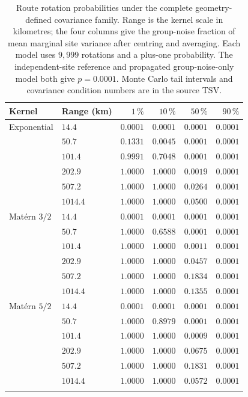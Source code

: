 \begin{table}[htbp]\centering\small
\caption{Route rotation probabilities under the complete geometry-defined covariance family. Range is the kernel scale in kilometres; the four columns give the group-noise fraction of mean marginal site variance after centring and averaging. Each model uses $9{,}999$ rotations and a plus-one probability. The independent-site reference and propagated group-noise-only model both give $p=0.0001$. Monte Carlo tail intervals and covariance condition numbers are in the source TSV.}
\label{tab:spatial-covariance}
\begin{tabular}{llrrrr}\toprule
Kernel & Range (km) & $1\,\%$ & $10\,\%$ & $50\,\%$ & $90\,\%$ \\\midrule
Exponential & $14.4$ & $0.0001$ & $0.0001$ & $0.0001$ & $0.0001$ \\
 & $50.7$ & $0.1331$ & $0.0045$ & $0.0001$ & $0.0001$ \\
 & $101.4$ & $0.9991$ & $0.7048$ & $0.0001$ & $0.0001$ \\
 & $202.9$ & $1.0000$ & $1.0000$ & $0.0019$ & $0.0001$ \\
 & $507.2$ & $1.0000$ & $1.0000$ & $0.0264$ & $0.0001$ \\
 & $1014.4$ & $1.0000$ & $1.0000$ & $0.0500$ & $0.0001$ \\
\addlinespace
Mat\'ern $3/2$ & $14.4$ & $0.0001$ & $0.0001$ & $0.0001$ & $0.0001$ \\
 & $50.7$ & $1.0000$ & $0.6588$ & $0.0001$ & $0.0001$ \\
 & $101.4$ & $1.0000$ & $1.0000$ & $0.0011$ & $0.0001$ \\
 & $202.9$ & $1.0000$ & $1.0000$ & $0.0457$ & $0.0001$ \\
 & $507.2$ & $1.0000$ & $1.0000$ & $0.1834$ & $0.0001$ \\
 & $1014.4$ & $1.0000$ & $1.0000$ & $0.1355$ & $0.0001$ \\
\addlinespace
Mat\'ern $5/2$ & $14.4$ & $0.0001$ & $0.0001$ & $0.0001$ & $0.0001$ \\
 & $50.7$ & $1.0000$ & $0.8979$ & $0.0001$ & $0.0001$ \\
 & $101.4$ & $1.0000$ & $1.0000$ & $0.0009$ & $0.0001$ \\
 & $202.9$ & $1.0000$ & $1.0000$ & $0.0675$ & $0.0001$ \\
 & $507.2$ & $1.0000$ & $1.0000$ & $0.1831$ & $0.0001$ \\
 & $1014.4$ & $1.0000$ & $1.0000$ & $0.0572$ & $0.0001$ \\
\addlinespace
\bottomrule\end{tabular}\end{table}


